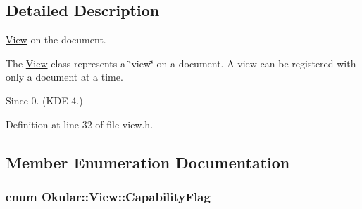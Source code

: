 \subsection{Detailed Description}
\hyperlink{classOkular_1_1View}{View} on the document. 

The \hyperlink{classOkular_1_1View}{View} class represents a \char`\"{}view\char`\"{} on a document. A view can be registered with only a document at a time.

\begin{DoxySince}{Since}
0. (K\+D\+E 4.) 
\end{DoxySince}


Definition at line 32 of file view.\+h.



\subsection{Member Enumeration Documentation}
\hypertarget{classOkular_1_1View_a8552668497a612628f53b5010df7a45e}{
\subsubsection[{Capability\+Flag}]{\setlength{\rightskip}{0pt plus 5cm}enum {\bf Okular\+::\+View\+::\+Capability\+Flag}}}\label{classOkular_1_1View_a8552668497a612628f53b5010df7a45e}
